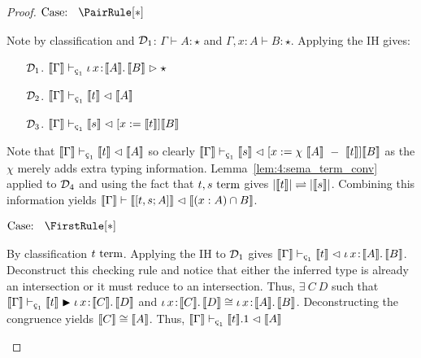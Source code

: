 \begin{proof}
    $\text{Case: }\begin{array}{c} \PairRule[*] \end{array}$
    \begin{proofcase}
        Note by classification and $\mathcal{D}_{1}$: $\Gamma \vdash A : \star$ and $\Gamma, x : A \vdash B : \star$.
        Applying the IH gives:
        \begin{enumerate}
            \item[$\mathcal{D}_{1}$.] $\sema{\Gamma} \vdash_{\oldced} \abs{\iota}{x}{\sema{A}}{\sema{B}} \infr \star$
            \item[$\mathcal{D}_{2}$.] $\sema{\Gamma} \vdash_{\oldced} \sema{t} \chck \sema{A}$
            \item[$\mathcal{D}_{3}$.] $\sema{\Gamma} \vdash_{\oldced} \sema{s} \chck [x := \sema{t}]\sema{B}$
        \end{enumerate}
        Note that $\sema{\Gamma} \vdash_{\oldced} \sema{t} \chck \sema{A}$ so clearly $\sema{\Gamma} \vdash_{\oldced} \sema{s} \chck [x := \chi\ \sema{A}\ -\ \sema{t}]\sema{B}$ as the $\chi$ merely adds extra typing information.
        Lemma~\ref{lem:4:sema_term_conv} applied to $\mathcal{D}_{4}$ and using the fact that $t, s~\textnormal{term}$ gives $|\llbracket t \rrbracket| \rightleftharpoons |\llbracket s \rrbracket|$.
        Combining this information yields $\llbracket \Gamma \rrbracket \vdash \llbracket [t, s; A] \rrbracket \vartriangleleft \llbracket (x : A) \cap B \rrbracket$.
    \end{proofcase}

    $\text{Case: }\begin{array}{c} \FirstRule[*] \end{array}$
    \begin{proofcase}
        By classification $t~\textnormal{term}$.
        Applying the IH to $\mathcal{D}_{1}$ gives $\sema{\Gamma} \vdash_{\oldced} \sema{t} \chck \abs{\iota}{x}{\sema{A}}{\sema{B}}$.
        Deconstruct this checking rule and notice that either the inferred type is already an intersection or it must reduce to an intersection.
        Thus, $\exists\ C\ D$ such that $\sema{\Gamma} \vdash_{\oldced} \sema{t} \cinfr \abs{\iota}{x}{\sema{C}}{\sema{D}}$ and ${\iota}\, x\! : \! \llbracket C \rrbracket.\, \llbracket D \rrbracket \cong {\iota}\, x\! : \! \llbracket A \rrbracket.\, \llbracket B \rrbracket$.
        Deconstructing the congruence yields $\llbracket C \rrbracket \cong \llbracket A \rrbracket$.
        Thus, $\sema{\Gamma} \vdash_{\oldced} \sema{t}.1 \chck \sema{A}$
    \end{proofcase}


\end{proof}
